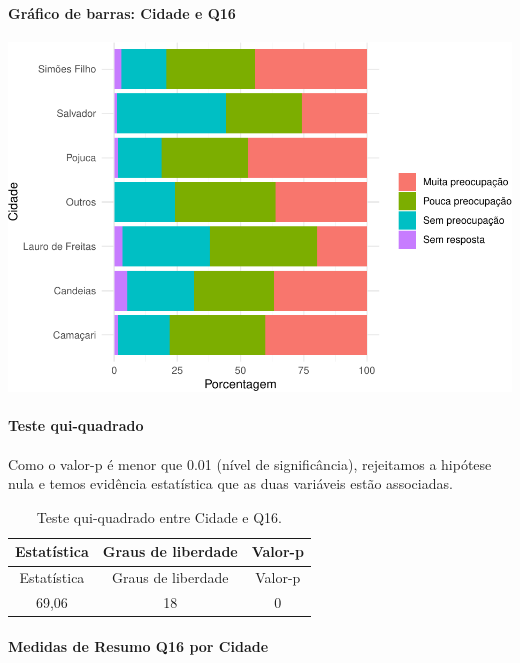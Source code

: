 \documentclass[]{article}
\let\oldparagraph\paragraph
\renewcommand{\paragraph}[1]{\oldparagraph{#1}\mbox{}}
\begin{document}
\hypertarget{gruxe1fico-de-barras-cidade-e-q16}{%
\paragraph{Gráfico de barras: Cidade e Q16}\label{gruxe1fico-de-barras-cidade-e-q16}}

\begin{center}\includegraphics[width=0.75\linewidth]{relatorio_covid19_files/figure-latex/unnamed-chunk-132-1} \end{center}

\hypertarget{teste-qui-quadrado-12}{%
\paragraph{Teste qui-quadrado}\label{teste-qui-quadrado-12}}

Como o valor-p é menor que 0.01 (nível de significância), rejeitamos a hipótese nula e temos evidência estatística que as duas variáveis estão associadas.

\begin{longtable}[]{@{}ccc@{}}
\caption{\label{tab:unnamed-chunk-134}Teste qui-quadrado entre Cidade e Q16.}\tabularnewline
\toprule
Estatística & Graus de liberdade & Valor-p\tabularnewline
\midrule
\endfirsthead
\toprule
Estatística & Graus de liberdade & Valor-p\tabularnewline
\midrule
\endhead
69,06 & 18 & 0\tabularnewline
\bottomrule
\end{longtable}

\cleardoublepage

\hypertarget{medidas-de-resumo-q16-por-cidade}{%
\paragraph{Medidas de Resumo Q16 por Cidade}\label{medidas-de-resumo-q16-por-cidade}}
\end{document}
